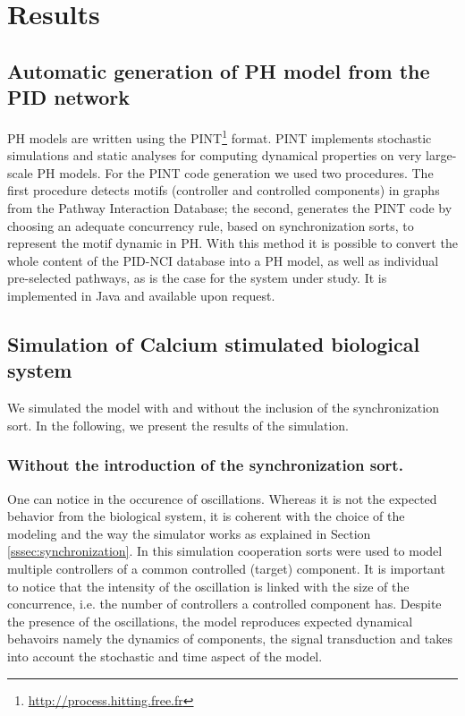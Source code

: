 \section{Results}
\subsection{Automatic generation of PH model from the PID network}
PH models are written using the PINT\footnote{\url{http://process.hitting.free.fr}} format.  
PINT implements stochastic simulations and static analyses for computing dynamical properties on very large-scale PH models.
For the PINT code generation we used two procedures.
The first procedure detects motifs (controller and controlled components) in graphs from the Pathway Interaction Database; the second, 
generates the PINT code by choosing an adequate concurrency rule, based on synchronization sorts, to represent the motif dynamic in PH.
With this method it is possible to convert the whole content of the PID-NCI database into a PH model, as well as individual pre-selected pathways, 
as is the case for the system under study.  It is implemented in Java and available upon request.

\subsection{Simulation of Calcium stimulated biological system}
We simulated the model with and without the inclusion of the synchronization sort. In the following, we present the results of 
the simulation.

\subsubsection{Without the introduction of the synchronization sort.}
One can notice in  the occurence of oscillations. Whereas it is not the expected behavior from the biological system,
 it is coherent with the choice of the modeling and the way the simulator works as explained in Section \ref{sssec:synchronization}.
In this simulation cooperation sorts were used to model multiple controllers of a common controlled (target) component.
It is important to notice that the intensity of the oscillation is linked with 
the size of the concurrence, i.e. the number of controllers a controlled component has.
Despite the presence of the oscillations, the model reproduces expected dynamical behavoirs  namely
the dynamics of components, the signal transduction and takes into account the stochastic and time aspect of the model.

